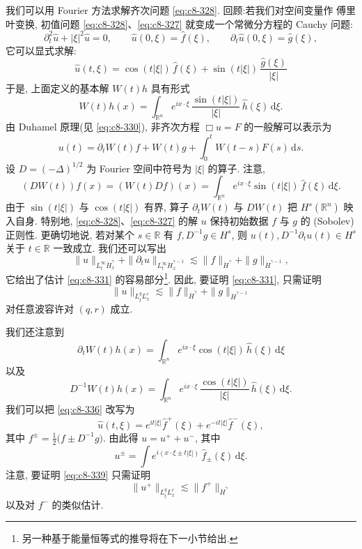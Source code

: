 我们可以用 Fourier 方法求解齐次问题 \eqref{eq:c8-328}. 回顾:若我们对空间变量作 傅里叶变换, 初值问题 \eqref{eq:c8-328}、\eqref{eq:c8-327} 就变成一个常微分方程的 Cauchy 问题:
\[
\partial_t^2\widehat{u}+|\xi|^2\widehat{u}=0, \qquad
\widehat{u}(0, \xi)=\widehat{f}(\xi), \qquad
\partial_t\widehat{u}(0, \xi)=\widehat{g}(\xi), 
\]
它可以显式求解:
\begin{equation}
\widehat{u}(t, \xi)=\cos(t|\xi|)\, \widehat{f}(\xi)+\sin(t|\xi|)\, \frac{\widehat{g}(\xi)}{|\xi|}\label{eq:c8-336}
\end{equation}
于是, 上面定义的基本解 $W(t)h$ 具有形式
\begin{equation}
W(t)h(x)=\int_{\mathbb{R}^n}e^{ix\cdot\xi}\, \frac{\sin(t|\xi|)}{|\xi|}\, \widehat{h}(\xi)\, \mathrm{d}\xi .\label{eq:c8-337}
\end{equation}
由 Duhamel 原理(见 \eqref{eq:c8-330}), 非齐次方程 $\Box u=F$ 的一般解可以表示为
\begin{equation}
u(t)=\partial_t W(t)f+W(t)g+\int_0^t W(t-s)F(s)\, \mathrm{d}s.\label{eq:c8-338}
\end{equation}
设 $D=(-\Delta)^{1/2}$ 为 Fourier 空间中符号为 $|\xi|$ 的算子. 注意, 
\[
(DW(t))f(x)=(W(t)Df)(x)=\int_{\mathbb{R}^n}e^{ix\cdot\xi}\sin(t|\xi|)\, \widehat{f}(\xi)\, \mathrm{d}\xi .
\]
由于 $\sin(t|\xi|)$ 与 $\cos(t|\xi|)$ 有界, 算子 $\partial_t W(t)$ 与 $DW(t)$ 把 $H^s(\mathbb{R}^n)$ 映入自身. 特别地, \eqref{eq:c8-328}、\eqref{eq:c8-327} 的解 $u$ 保持初始数据 $f$ 与 $g$ 的 (Sobolev) 正则性. 更确切地说, 若对某个 $s\in\mathbb{R}$ 有 $f, D^{-1}g\in H^s$, 则 $u(t), D^{-1}\partial_t u(t)\in H^s$ 关于 $t\in\mathbb{R}$ 一致成立. 我们还可以写出
\[
\|u\|_{L_t^\infty\dot{H}_x^\gamma}+\|\partial_t u\|_{L_t^\infty\dot{H}_x^{\gamma-1}}\lesssim\|f\|_{\dot{H}^\gamma}+\|g\|_{\dot{H}^{\gamma-1}}, 
\]
它给出了估计 \eqref{eq:c8-331} 的容易部分\footnote{另一种基于能量恒等式的推导将在下一小节给出. }. 因此, 要证明 \eqref{eq:c8-331}, 只需证明
\begin{equation}
\|u\|_{L_t^q L_x^r}\lesssim\|f\|_{\dot{H}^\gamma}+\|g\|_{\dot{H}^{\gamma-1}}\label{eq:c8-339}
\end{equation}
对任意波容许对 $(q, r)$ 成立. 

我们还注意到
\[
\partial_t W(t)h(x)=\int_{\mathbb{R}^n}e^{ix\cdot\xi}\cos(t|\xi|)\, \widehat{h}(\xi)\, \mathrm{d}\xi
\]
以及
\[
D^{-1}W(t)h(x)=\int_{\mathbb{R}^n}e^{ix\cdot\xi}\, \frac{\cos(t|\xi|)}{|\xi|}\, \widehat{h}(\xi)\, \mathrm{d}\xi .
\]
我们可以把 \eqref{eq:c8-336} 改写为
\[
\widehat{u}(t, \xi)=e^{it|\xi|}\widehat{f}^{+}(\xi)+e^{-it|\xi|}\widehat{f}^{-}(\xi), 
\]
其中 $f^{\pm}=\frac{1}{2}\bigl(f\pm D^{-1}g\bigr)$. 由此得 $u=u^{+}+u^{-}$, 其中
\[
u^{\pm}=\int e^{i(x\cdot\xi\pm t|\xi|)}\, \widehat{f}_{\pm}(\xi)\, \mathrm{d}\xi .
\]
注意, 要证明 \eqref{eq:c8-339} 只需证明
\begin{equation}
\|u^{+}\|_{L_t^q L_x^r}\lesssim\|f^{+}\|_{\dot{H}^\gamma}\label{eq:c8-340}
\end{equation}
以及对 $f^{-}$ 的类似估计. 

